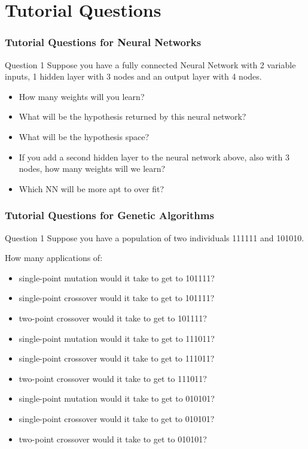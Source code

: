 \documentclass[aspectratio=169, 10pt]{beamer}
\begin{document}
\section{Tutorial Questions}
\begin{frame}
    \frametitle{Tutorial Questions for Neural Networks}

    \begin{block}{Question 1}
        Suppose you have a fully connected Neural Network with 2 variable inputs, 1 hidden layer with 3 nodes and an output layer with 4 nodes.
    \end{block}

    \begin{itemize}
        \item How many weights will you learn?
        \item What will be the hypothesis returned by this neural network?
        \item What will be the hypothesis space?
        \item If you add a second hidden layer to the neural network above, also with 3 nodes, how many weights will we learn?
        \item Which NN will be more apt to over fit?
    \end{itemize}
\end{frame}

\begin{frame}
    \frametitle{Tutorial Questions for Genetic Algorithms}

    \begin{block}{Question 1}
        Suppose you have a population of two individuals 111111 and 101010.    
    \end{block}

    How many applications of:
    \begin{itemize}
        \item single-point mutation would it take to get to 101111?
        \item single-point crossover would it take to get to  101111?
        \item two-point crossover would it take to get to  101111?
        \item single-point mutation would it take to get to  111011?
        \item single-point crossover would it take to get to  111011?
        \item two-point crossover would it take to get to  111011?
        \item single-point mutation would it take to get to  010101?
        \item single-point crossover would it take to get to  010101?
        \item two-point crossover would it take to get to  010101?
    \end{itemize}
\end{frame}
\end{document}
